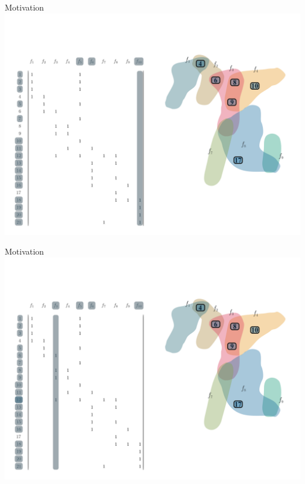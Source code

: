 \documentclass[10pt]{beamer}
\begin{document}
\begin{frame}[fragile]{Motivation}
    \vspace*{-3em}\hspace*{-2em}\includegraphics[width=1.15\textwidth]{Images/LSAExample/08}
\end{frame}

\begin{frame}[fragile]{Motivation}
    \vspace*{-3em}\hspace*{-2em}\includegraphics[width=1.15\textwidth]{Images/LSAExample/09}
\end{frame}
\end{document}
